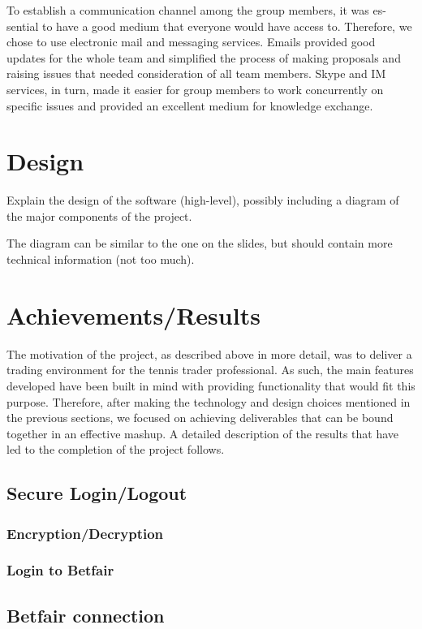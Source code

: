 \documentclass[10pt]{report}
\begin{document}
To establish a communication channel among the group members, it was es-
sential to have a good medium that everyone would have access to. Therefore,
we chose to use electronic mail and messaging services. Emails provided good
updates for the whole team and simplified the process of making proposals and
raising issues that needed consideration of all team members. Skype and IM
services, in turn, made it easier for group members to work concurrently on
specific issues and provided an excellent medium for knowledge exchange.

\section{Design}
Explain the design of the software (high-level), possibly including a diagram of the major components of the project.

The diagram can be similar to the one on the slides, but should contain more technical information (not too much).

\section{Achievements/Results}

The motivation of the project, as described above in more detail, was to deliver a trading environment for the tennis trader professional. As such, the main features developed have been built in mind with providing functionality that would fit this purpose. Therefore, after making the technology and design choices mentioned in the previous sections, we focused on achieving deliverables that can be bound together in an effective mashup. A detailed description of the results that have led to the completion of the project follows.

\subsection {Secure Login/Logout}
\subsubsection {Encryption/Decryption}
\subsubsection {Login to Betfair}


\subsection {Betfair connection}
\end{document}
